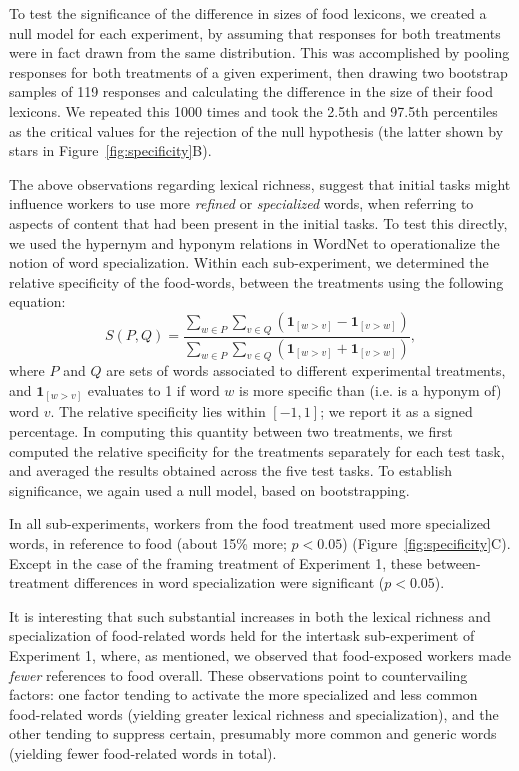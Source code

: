 \documentclass{sigchi}
\begin{document}
To test the significance of the difference in sizes of food
lexicons,
we created a null model for each experiment, by assuming that
responses for both treatments were in fact drawn from the same 
distribution.
This was accomplished by pooling responses for both treatments 
of a given experiment, then 
drawing two bootstrap samples of 119 responses and calculating
the difference in the size of their food lexicons.  
We repeated this 1000 times and took the 2.5th and 97.5th percentiles 
as the critical values for the rejection of the null hypothesis 
(the latter shown by stars in Figure~\ref{fig:specificity}B).

The above observations regarding lexical richness, suggest that initial 
tasks might influence workers to use more \textit{refined} or 
\textit{specialized} words, when referring to aspects 
of content that had been present in the initial tasks.  
To test this directly, we used the hypernym and hyponym relations in 
WordNet to operationalize the notion of word specialization.  
Within each sub-experiment, we determined the relative specificity
of the food-words, between the treatments using the following equation:
\begin{equation}
	S(P,Q) = \frac{
		\sum_{w\in P}\sum_{v\in Q} \left(
			\mathbf{1}_{[w>v]} - \mathbf{1}_{[v>w]} \right)
	}{
		\sum_{w\in P}\sum_{v\in Q} \left(
			\mathbf{1}_{[w>v]} + \mathbf{1}_{[v>w]} \right)
	},
\end{equation}
where $P$ and $Q$ are sets of words associated to different experimental 
treatments, and $\mathbf{1}_{[w>v]}$ evaluates
to 1 if word $w$ is more specific than (i.e. is a hyponym of) word $v$.
The relative specificity lies within $[-1,1]$; 
we report it as a signed percentage.
In computing this quantity between two treatments, we first computed the 
relative specificity for the treatments separately for each test task, and 
averaged the results obtained across the five test tasks.  To establish
significance, we again used a null model, based on bootstrapping.

In all sub-experiments,
workers from the food treatment used more specialized words, 
in reference to food 
(about 15\% more; $p < 0.05$) (Figure~\ref{fig:specificity}C).
Except in the case of the framing treatment of Experiment 1, these 
between-treatment differences in word specialization were significant 
($p<0.05$).

It is interesting that such substantial increases in both the lexical 
richness and specialization of food-related words 
held for the intertask sub-experiment of Experiment 1, where, as mentioned,
we observed 
that food-exposed workers made \textit{fewer} references to food overall. 
These observations point 
to countervailing factors: one factor tending to activate the more 
specialized and less common food-related words 
(yielding greater lexical richness and specialization), and the other tending 
to suppress certain, presumably more common and generic words 
(yielding fewer food-related words in total).
\end{document}
